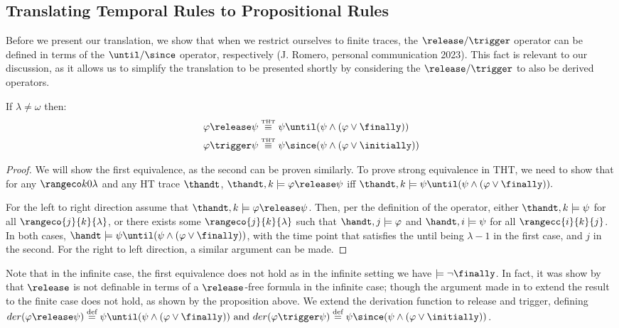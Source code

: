 \subsection{Translating Temporal Rules to Propositional Rules}

Before we present our translation, we show that when we restrict
ourselves to finite traces, the $\release/\trigger$ operator can be
defined in terms of the $\until/\since$ operator, respectively
(J. Romero, personal communication 2023).  This fact is relevant to
our discussion, as it allows us to simplify the translation to be
presented shortly by considering the $\release/\trigger$ to also be
derived operators.

\begin{proposition}

If $\lambda \neq \omega$ then:
\begin{align*}
\varphi \release \psi &\equivtht \psi \until (\psi \wedge (\varphi \vee \finally)) \\
\varphi \trigger \psi &\equivtht \psi \since (\psi \wedge (\varphi \vee \initially))
\end{align*}
\end{proposition}
\begin{proof}
  We will show the first equivalence, as the second can be proven
  similarly.  To prove strong equivalence in THT, we need to show that
  for any $\kinlambda$ and any HT trace $\thandt$,
  $\thandt,k \models \varphi \release \psi$ iff
  $\thandt,k \models \psi \until (\psi \wedge (\varphi \vee
  \finally)).$

  For the left to right direction assume that
  $\thandt,k \models \varphi \release \psi$. Then, per the definition
  of the operator, either $\thandt,k \models \psi$ for all
  $\rangeco{j}{k}{\lambda}$, or there exists some
  $\rangeco{j}{k}{\lambda}$ such that $\handt,j \models \varphi$ and
  $\handt,i \models \psi$ for all $\rangecc{i}{k}{j}$. In both cases,
  $\handt \models \psi \until (\psi \wedge (\varphi \vee \finally))$,
  with the time point that satisfies the until being $\lambda-1$ in
  the first case, and $j$ in the second. For the right to left
  direction, a similar argument can be made.
\end{proof}

Note that in the infinite case, the first equivalence does not hold as
in the infinite setting we have $\models \neg \finally$. In fact, it
was show by \cite{babodife20a} that $\release$ is not definable in
terms of a $\release$-free formula in the infinite case; though the
argument made in \cite[p. 20]{agcadipescscvi20a} to extend the result
to the finite case does not hold, as shown by the proposition
above. We extend the derivation function to release and trigger,
defining
$der(\varphi \release \psi) \defeq \psi \until (\psi \wedge (\varphi
\vee \finally)) \text{ and } der(\varphi \trigger \psi) \defeq \psi \since (\psi
\wedge (\varphi \vee \initially))$.

